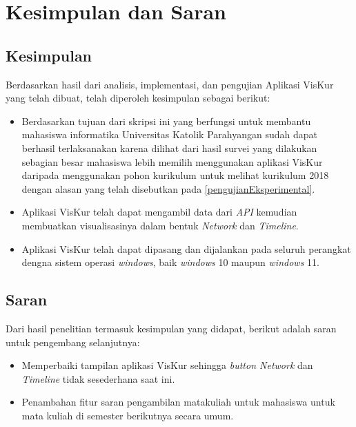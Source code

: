 \chapter{Kesimpulan dan Saran}
\label{chap:kesimpulan}

\section{Kesimpulan}
Berdasarkan hasil dari analisis, implementasi, dan pengujian Aplikasi VisKur yang telah dibuat, telah diperoleh kesimpulan sebagai berikut:

\begin{itemize}
    \item Berdasarkan tujuan dari skripsi ini yang berfungsi untuk membantu mahasiswa informatika Universitas Katolik Parahyangan sudah dapat berhasil terlaksanakan karena dilihat dari hasil survei yang dilakukan sebagian besar mahasiswa lebih memilih menggunakan aplikasi VisKur daripada menggunakan pohon kurikulum untuk melihat kurikulum 2018 dengan alasan yang telah disebutkan pada \ref{pengujianEksperimental}.
    
    \item Aplikasi VisKur telah dapat mengambil data dari \textit{API} kemudian membuatkan visualisasinya dalam bentuk \textit{Network} dan \textit{Timeline}.
    
    \item Aplikasi VisKur telah dapat dipasang dan dijalankan pada seluruh perangkat dengna sistem operasi \textit{windows}, baik \textit{windows} 10 maupun \textit{windows} 11.
\end{itemize}

\section{Saran}
Dari hasil penelitian termasuk kesimpulan yang didapat, berikut adalah saran untuk pengembang selanjutnya:

\begin{itemize}
    \item Memperbaiki tampilan aplikasi VisKur sehingga \textit{button Network} dan \textit{Timeline} tidak sesederhana saat ini.
    
    \item Penambahan fitur saran pengambilan matakuliah untuk mahasiswa untuk mata kuliah di semester berikutnya secara umum.
\end{itemize}

